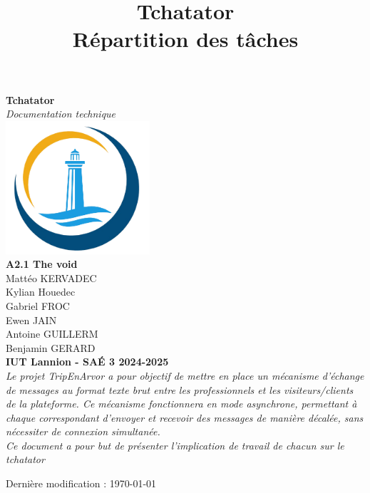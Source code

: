 \documentclass{report}
\title{\Huge Tchatator \\ {\LARGE Répartition des tâches}}
\begin{document}
\begin{titlepage}
    \begin{center}
        {\Huge\bfseries Tchatator} \\[1cm]
        {\Large\textit{Documentation technique}} \\[2cm]

        \includegraphics[width=0.4\textwidth]{../../../html/img/logo.png} \\[2cm]

        {\Large \textbf{A2.1 The void}} \\ [.2cm]
        {\large Mattéo KERVADEC } \\[.2cm]
        {\large Kylian Houedec } \\[.2cm]
        {\large Gabriel FROC } \\[.2cm]
        {\large Ewen JAIN } \\[.2cm]
        {\large Antoine GUILLERM } \\[.2cm]
        {\large Benjamin GERARD } \\[1cm]

        \textbf{IUT Lannion - SAÉ 3 2024-2025} \\[1.2cm]

        \textit{
        Le projet TripEnArvor a pour objectif de mettre en place un mécanisme d’échange de messages au format texte brut entre les professionnels et les visiteurs/clients de la plateforme. Ce mécanisme fonctionnera en mode asynchrone, permettant à chaque correspondant d’envoyer et recevoir des messages de manière décalée, sans nécessiter de connexion simultanée. 
		} \\[0.5cm]
		
		\textit{
        Ce document a pour but de présenter l'implication de travail de chacun sur le tchatator
		}

        \vfill  %

        {\small Dernière modification : \today}
    \end{center}
\end{titlepage}
\end{document}
